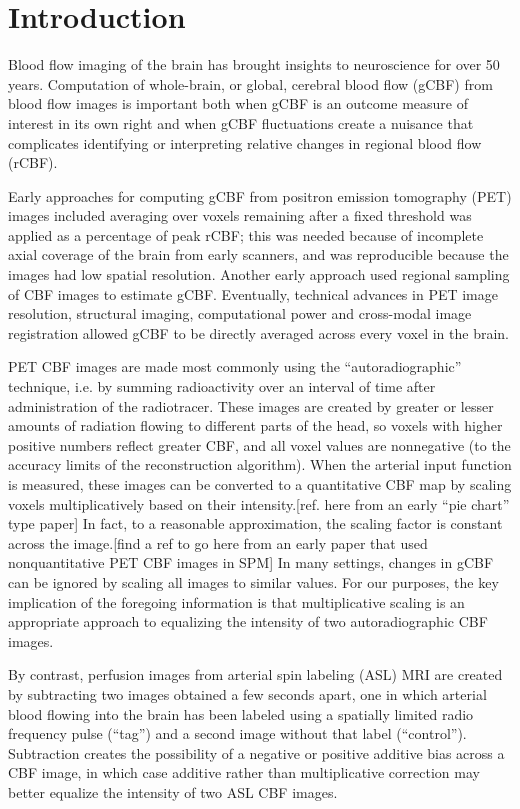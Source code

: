 \section{Introduction}
Blood flow imaging of the brain has brought insights to neuroscience for over 50 years.\cite{Taber_2005} Computation of whole-brain, or global, cerebral blood flow (gCBF) from blood flow images is important both when gCBF is an outcome measure of interest in its own right and when gCBF fluctuations create a nuisance that complicates identifying or interpreting relative changes in regional blood flow (rCBF).\cite{Small_2004} 

Early approaches for computing gCBF from positron emission tomography (PET) images included averaging over voxels remaining after a fixed threshold was applied as a percentage of peak rCBF; this was needed because of incomplete axial coverage of the brain from early scanners, and was reproducible because the images had low spatial resolution.\cite{6609680} Another early approach used regional sampling of CBF images to estimate gCBF.\cite{6971299,Perlmutter_1985} Eventually, technical advances in PET image resolution, structural imaging, computational power and cross-modal image registration allowed gCBF to be directly averaged across every voxel in the brain.

PET CBF images are made most commonly using the ``autoradiographic'' technique, i.e. by summing radioactivity over an interval of time after administration of the radiotracer. These images are created by greater or lesser amounts of radiation flowing to different parts of the head, so voxels with higher positive numbers reflect greater CBF, and all voxel values are nonnegative (to the accuracy limits of the reconstruction algorithm). When the arterial input function is measured, these images can be converted to a quantitative CBF map by scaling voxels multiplicatively based on their intensity.[ref. here from an early ``pie chart'' type paper] In fact, to a reasonable approximation, the scaling factor is constant across the image.[find a ref to go here from an early paper that used nonquantitative PET CBF images in SPM] In many settings, changes in gCBF can be ignored by scaling all images to similar values. For our purposes, the key implication of the foregoing information is that multiplicative scaling is an appropriate approach to equalizing the intensity of two autoradiographic CBF images.

By contrast, perfusion images from arterial spin labeling (ASL) MRI are created by subtracting two images obtained a few seconds apart, one in which arterial blood flowing into the brain has been labeled using a spatially limited radio frequency pulse (``tag'') and a second image without that label (``control'').\cite{Aguirre_2012} Subtraction creates the possibility of a negative or positive additive bias across a CBF image, in which case additive rather than multiplicative correction may better equalize the intensity of two ASL CBF images.

